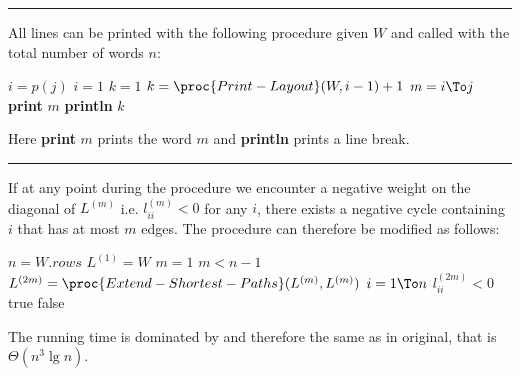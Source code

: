 \documentclass[a4paper,parskip=half]{scrartcl}
\newenvironment{solution}[1]{
\rule{\textwidth}{1pt}
\begin{description}[leftmargin=3em, style=nextline, topsep=0em,
font={\bfseries\rmfamily}]
\item[#1]
}{
\end{description}
}
\begin{document}
\begin{solution}{II-4}
All lines can be printed with the following procedure given $W$ and
called with the total number of words $n$:

\begin{codebox}
\li $i = p(j)$
\li \If $i = 1$ \Then
\li   $k = 1$
\li \Else
\li   $k = \proc{Print-Layout}(W,i-1) + 1$ \End
\li \For $m = i \To j$ \Do
\li   \textbf{print} $m$ \End
\li \textbf{println}
\li \Return $k$
\end{codebox}

Here \textbf{print} $m$ prints the word $m$ and \textbf{println} prints a
line break. \

\end{solution}

\begin{solution}{II-5}

If at any point during the procedure we encounter a negative weight on the
diagonal of $L^{(m)}$ i.e. $l_{ii}^{(m)} < 0$ for any $i$, there exists a negative cycle
containing $i$ that has at most $m$ edges. The procedure
 can therefore be modified as follows:

\begin{codebox}
\li $n = W.rows$
\li $L^{(1)} = W$
\li $m = 1$
\li \While $m < n - 1$ \Do
\li   $L^{(2m)} = \proc{Extend-Shortest-Paths}(L^{(m)}, L^{(m)})$
\li   \For $i = 1 \To n$ \Do
\li     \If $l_{ii}^{(2m)} < 0$ \Then
\li       \Return true \End \End \End
\li \Return false
\end{codebox}

The running time is dominated by  and therefore
the same as in original, that is $\Theta(n^3 \lg n)$.

\end{solution}
\end{document}
